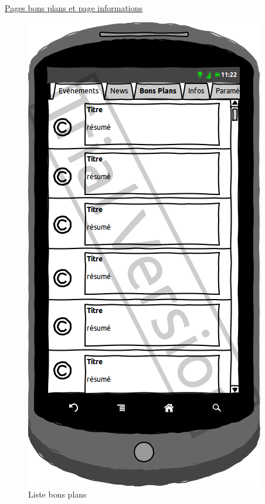 \documentclass[a4paper, 11pt]{article}
\begin{document}
\underline{Pages bons plans et page informations}\\
\begin{figure}[htbp]
	\begin{minipage}[c]{.33\linewidth}
		\begin{center}
			\includegraphics[scale=0.3]{../../Sketch/Android/BP.png}
		\end{center}
	\caption{Liste bons plans}
	\end{minipage}
	\begin{minipage}[c]{.33\linewidth}
		\begin{center}

\end{center}
\end{minipage}
\end{figure}
\end{document}
